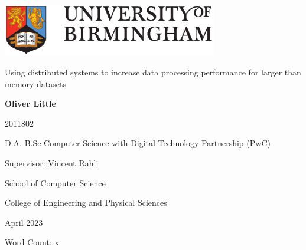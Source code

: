 \begin{titlepage}
	\begin{center}
		\vspace*{1cm}
		
		\includegraphics[width=0.7\textwidth]{uob-logo.eps}
		
		\vspace{1.5cm}
		
		\huge
		Using distributed systems to increase data processing performance for larger than memory datasets
		
		
		
		\vspace{2cm}
		
		\large
		\textbf{Oliver Little}
		
		\vspace{0.25cm}
		
		\small 2011802
		
		\vspace{0.25cm}
		
		\large
		D.A. B.Sc Computer Science with Digital Technology Partnership (PwC)
		
		\vspace{1.5cm}
		
		Supervisor: Vincent Rahli
		
		\vspace{1.5cm}
		
		\large
		School of Computer Science
		
		\large
		College of Engineering and Physical Sciences
		
		\large
		April 2023
		
		\vspace{1.5cm}
		
		\normalsize
		Word Count: x
		
	\end{center}
\end{titlepage}